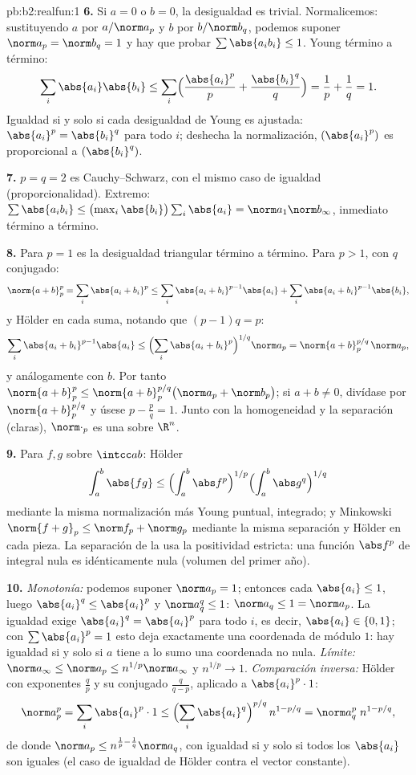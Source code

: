 \begin{solution}{pb:b2:realfun:1}
\textbf{6.} Si $a = 0$ o $b = 0$, la desigualdad es trivial.
Normalicemos: sustituyendo $a$ por $a/\norm a_p$ y $b$ por $b/\norm
b_q$, podemos suponer $\norm a_p = \norm b_q = 1$ y hay que probar
$\sum\abs{a_ib_i} \leq 1$. Young término a término:
\[
\sum_i\abs{a_i}\abs{b_i} \leq
\sum_i\Bigl(\frac{\abs{a_i}^p}{p} +
\frac{\abs{b_i}^q}{q}\Bigr) = \frac1p + \frac1q = 1 .
\]
Igualdad si y solo si cada desigualdad de Young es ajustada:
$\abs{a_i}^p = \abs{b_i}^q$ para todo $i$; deshecha la
normalización, $(\abs{a_i}^p)$ es proporcional a $(\abs{b_i}^q)$.

\textbf{7.} $p = q = 2$ es Cauchy--Schwarz, con el mismo caso de
igualdad (proporcionalidad). Extremo: $\sum\abs{a_ib_i} \leq
\bigl(\max_i\abs{b_i}\bigr)\sum_i\abs{a_i} = \norm a_1\norm
b_\infty$, inmediato término a término.

\textbf{8.} Para $p = 1$ es la desigualdad triangular término a
término. Para $p > 1$, con $q$ conjugado:
\[
\norm{a+b}_p^p = \sum_i\abs{a_i + b_i}^p
\leq \sum_i\abs{a_i+b_i}^{p-1}\abs{a_i} +
\sum_i\abs{a_i+b_i}^{p-1}\abs{b_i},
\]
y Hölder en cada suma, notando que $(p - 1)q = p$:
\[
\sum_i\abs{a_i+b_i}^{p-1}\abs{a_i} \leq
\Bigl(\sum_i\abs{a_i+b_i}^{p}\Bigr)^{1/q}\norm a_p
= \norm{a + b}_p^{p/q}\,\norm a_p ,
\]
y análogamente con $b$. Por tanto $\norm{a+b}_p^p \leq \norm{a +
b}_p^{p/q}\bigl(\norm a_p + \norm b_p\bigr)$; si $a + b \neq 0$,
divídase por $\norm{a+b}_p^{p/q}$ y úsese $p - \frac pq = 1$. Junto
con la homogeneidad y la separación (claras), $\norm\cdot_p$ es una
 sobre $\R^n$.

\textbf{9.} Para $f, g$  sobre $\intcc ab$: Hölder
\[
\int_a^b\abs{fg} \leq \Bigl(\int_a^b\abs
f^p\Bigr)^{1/p}\Bigl(\int_a^b\abs g^q\Bigr)^{1/q}
\]
mediante la misma normalización más Young puntual, integrado; y
Minkowski $\norm{f + g}_p \leq \norm f_p + \norm g_p$ mediante la
misma separación y Hölder en cada pieza. La separación de la 
usa la positividad estricta: una función  $\abs f^p$ de
integral nula es idénticamente nula (volumen del primer año).

\textbf{10.} \emph{Monotonía:} podemos suponer $\norm a_p = 1$;
entonces cada $\abs{a_i} \leq 1$, luego $\abs{a_i}^q \leq
\abs{a_i}^p$ y $\norm a_q^q \leq 1$: $\norm a_q \leq 1 = \norm
a_p$. La igualdad exige $\abs{a_i}^q = \abs{a_i}^p$ para todo $i$,
es decir, $\abs{a_i} \in \{0, 1\}$; con $\sum\abs{a_i}^p = 1$ esto
deja exactamente una coordenada de módulo $1$: hay igualdad si y
solo si $a$ tiene a lo sumo una coordenada no nula. \emph{Límite:}
$\norm a_\infty \leq \norm a_p \leq n^{1/p}\norm a_\infty$ y
$n^{1/p} \to 1$. \emph{Comparación inversa:} Hölder con exponentes
$\frac qp$ y su conjugado $\frac{q}{q-p}$, aplicado a
$\abs{a_i}^p\cdot 1$:
\[
\norm a_p^p = \sum_i\abs{a_i}^p\cdot 1 \leq
\Bigl(\sum_i\abs{a_i}^{q}\Bigr)^{p/q}\,n^{1 - p/q}
= \norm a_q^{p}\; n^{1-p/q},
\]
de donde $\norm a_p \leq n^{\frac1p - \frac1q}\norm a_q$, con
igualdad si y solo si todos los $\abs{a_i}$ son iguales (el caso de
igualdad de Hölder contra el vector constante).


\end{solution}
